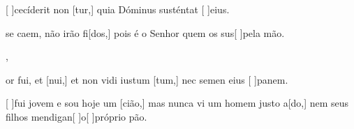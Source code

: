 {    {\item {}[ ]{ce}cíderit non [tur,] quia Dóminus susténtat [ ]{e}ius.}%
        {\item {} se caem, não irão fi[dos,] pois é o Senhor quem os sus[ ]{pe}la mão.},
    {\item {}or fui, et [nui,] et non vidi iustum [tum,] nec semen eius [ ]{pa}nem.}%
        {\item {}[ ]{fui} jovem e sou hoje um [cião,] mas nunca vi um homem justo a[\-do,] nem seus filhos mendigan[ ]{o}[ ]{pró}prio pão.}
}